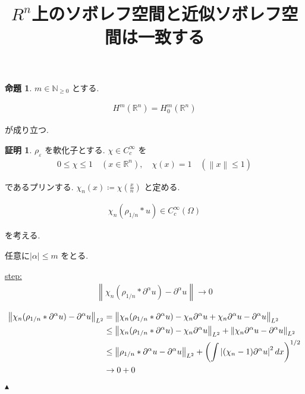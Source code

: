 \documentclass[10pt, fleqn, label-section=none]{bxjsarticle}
\title{$R^n$上のソボレフ空間と近似ソボレフ空間は一致する}
\date{}
\author{}
\theoremstyle{definition}
\newtheorem{prop}[dfn]{命題}
\newtheorem*{pf*}{証明}
\newcommand{\veps}{\varepsilon}
\newcommand{\paren}[1]{\mleft( #1\mright )}
\newcommand{\abs}[1]{\left|#1\right|}
\newcommand{\norm}[1]{\left\|#1\right\|}
\renewcommand{\;}{\, ; \,}
\newenvironment{claim}[1]{\par\noindent\underline{step:}\space#1}{}
\newenvironment{claimproof}[1]{\par\noindent{($\because$)}\space#1}{\hfill $\blacktriangle $}
\begin{document}
\maketitle

\section{}

\begin{prop}$m \in \mathbb N_{\geq 0}$ とする. 

\begin{align*} H^m(\mathbb R^n) = H_0^m (\mathbb R^n) \end{align*}

が成り立つ. 

\end{prop}
\begin{pf*}$\rho_\veps$ を軟化子とする.  $\chi \in C_c^\infty$ を
\begin{align*} 0 \leq \chi \leq 1 \quad (x  \in \mathbb R^n), \quad \chi (x) = 1 \quad( \norm x \leq 1)  \end{align*}

であるプリンする. $\chi_n (x) \coloneqq \chi(\frac{x}{n})$ と定める. 

\begin{align*} \chi_n (\rho_{1/n} * u) \in C_c^\infty (\Omega) \end{align*}

を考える. 

任意に$\abs \alpha \leq m$ をとる. 

\begin{claim}

\begin{align*} \norm{  \chi_n (\rho_{1/n} * \partial^\alpha  u ) - \partial^\alpha u     } \rightarrow 0 \end{align*}

\end{claim}
\begin{claimproof}

\begin{align*} 
\norm{  \chi_n (\rho_{1/n} * \partial^\alpha  u ) - \partial^\alpha u     }_{L^2}
&= \norm{  \chi_n (\rho_{1/n} * \partial^\alpha  u ) - \chi_n \partial^\alpha u + \chi_n \partial^\alpha u - \partial^\alpha u     }_{L^2}
\\&\leq \norm{  \chi_n (\rho_{1/n} * \partial^\alpha  u ) - \chi_n \partial^\alpha u } _{L^2}+ \norm{ \chi_n \partial^\alpha u - \partial^\alpha u     }_{L^2}
\\&\leq \norm{\rho_{1/n} * \partial^\alpha u - \partial^\alpha u}_{L^2} +\paren{\int \abs{(\chi_n - 1) \partial^\alpha u} ^2 dx }^{1/2}
\\&\rightarrow 0 + 0 
\end{align*}



\end{claimproof}
\end{pf*}
\end{document}
